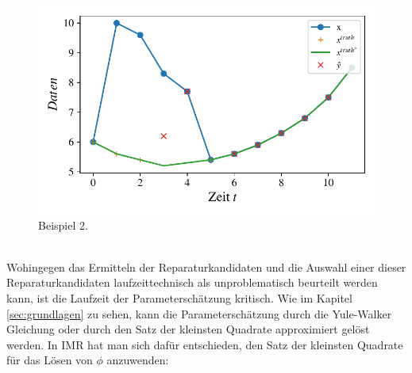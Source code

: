 \begin{figure}
      \centering
      \includegraphics[width=\textwidth,keepaspectratio]{../plots/beispiel2_data.pdf}
    \caption{Beispiel 2.}\label{fig:2}
\end{figure}
~\\
Wohingegen das Ermitteln der Reparaturkandidaten und die Auswahl einer dieser Reparaturkandidaten laufzeittechnisch als unproblematisch beurteilt werden kann,
ist die Laufzeit der Parameterschätzung kritisch. Wie im Kapitel \ref{sec:grundlagen} zu sehen, kann die Parameterschätzung durch die Yule-Walker Gleichung oder durch den Satz der kleinsten Quadrate approximiert gelöst werden. In IMR hat man sich dafür entschieden, den Satz der kleinsten Quadrate für das Lösen von $\phi$ anzuwenden:
